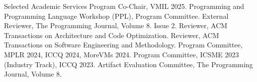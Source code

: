 \begin{rubric}{Selected Academic Services}
  \entry*[2025] Program Co-Chair, VMIL 2025.
  \entry*[2025] Programming and Programming Language Workshop (PPL), Program Committee.
  \entry*[2024] External Reviewer, The Programming Journal, Volume 8. Issue 2.
  \entry*[2024] Reviewer, ACM Transactions on Architecture and Code Optimization.
  \entry*[2024] Reviewer, ACM Transactions on Software Engineering and Methodology.
  \entry*[2024] Program Committee, MPLR 2024, ICCQ 2024, MoreVMs 2024.
  \entry*[2023] Program Committee, ICSME 2023 (Industry Track), ICCQ 2023.
  \entry*[2023] Artifact Evaluation Committee, The Programming Journal, Volume 8.
\end{rubric}
